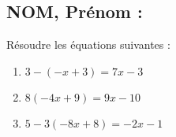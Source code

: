 \documentclass[a4paper,11pt,exos]{nsi} %
\begin{document}
\subsection*{NOM, Prénom : \dotfill} 


\maketitle




\begin{exercice}
Résoudre les équations suivantes :
\begin{multicols}{3}
	\begin{enumerate}
		
		\item $3-(-x+3)=7x-3$
		\item $8(-4x+9)=9x-10$
		\item $5-3(-8x+8)=-2x-1$
	\end{enumerate}
\end{multicols}

\end{exercice}

\end{document}
